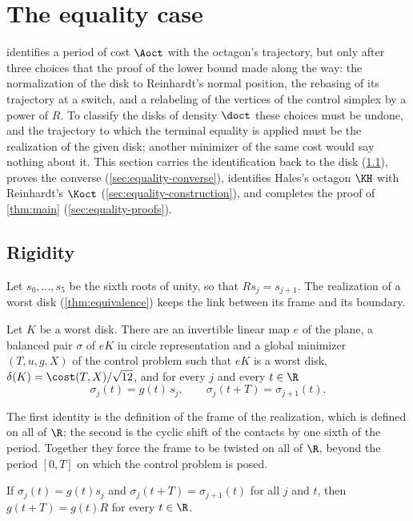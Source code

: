 \section{The equality case}\label{sec:equality}

 identifies a period of cost $\Aoct$ with the octagon's trajectory,
but only after three choices that the proof of the lower bound made along the way: the
normalization of the disk to Reinhardt's normal position, the rebasing of its trajectory at a
switch, and a relabeling of the vertices of the control simplex by a power of $R$. To classify the
disks of density $\doct$ these choices must be undone, and the trajectory to which the terminal
equality is applied must be the realization of the given disk; another minimizer of the same
cost would say nothing about it. This section carries the identification back to the disk
(\cref{sec:equality-rigidity}), proves the converse (\cref{sec:equality-converse}), identifies
Hales's octagon $\KH$ with Reinhardt's $\Koct$ (\cref{sec:equality-construction}), and completes
the proof of \cref{thm:main} (\cref{sec:equality-proofs}).

\subsection{Rigidity}\label{sec:equality-rigidity}

Let $s_0,\dots,s_5$ be the sixth roots of unity, so that $Rs_j=s_{j+1}$. The realization of a worst
disk (\cref{thm:equivalence}) keeps the link between its frame and its boundary.

\begin{lemma}\label{lem:eq-realization}
Let $K$ be a worst disk. There are an invertible linear map $e$ of the plane, a balanced pair
$\sigma$ of $eK$ in circle representation and a global minimizer $(T,u,g,X)$ of the control
problem such that $eK$ is a worst disk, $\delta(K)=\cost(T,X)/\sqrt{12}$, and for every $j$ and
every $t\in\R$
\[
 \sigma_j(t)=g(t)\,s_j,\qquad \sigma_j(t+T)=\sigma_{j+1}(t).
\]
\end{lemma}

The first identity is the definition of the frame of the realization, which is defined on all
of $\R$; the second is the cyclic shift of the contacts by one sixth of the period. Together they
force the frame to be twisted on all of $\R$, beyond the period $[0,T]$ on which the control
problem is posed.

\begin{lemma}\label{lem:eq-frame-twist}
If $\sigma_j(t)=g(t)s_j$ and $\sigma_j(t+T)=\sigma_{j+1}(t)$ for all $j$ and $t$, then
$g(t+T)=g(t)R$ for every $t\in\R$.
\end{lemma}

